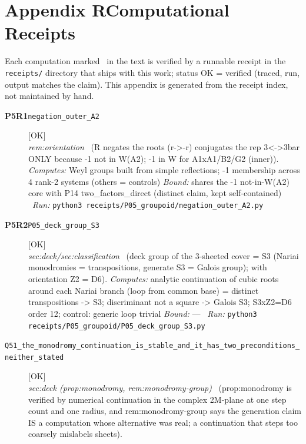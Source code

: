 \clearpage
\section*{Appendix R\quad Computational Receipts}\label{app:receipts}
\small\noindent Each computation marked \rcptmarker\ in the text is verified by a runnable receipt in the \texttt{receipts/} directory that ships with this work; status \textsf{OK} = verified (traced, run, output matches the claim). This appendix is generated from the receipt index, not maintained by hand.\par\medskip
\begingroup\renewcommand{\arraystretch}{1.25}
\begin{description}
\item[\textbf{P5R1}\quad\texttt{negation\_outer\_A2}]\hfill\textsf{[OK]}\\
\textit{rem:orientation} \ (R negates the roots (r->-r) conjugates the rep 3<->3bar ONLY because -1 not in W(A2); -1 in W for A1xA1/B2/G2 (inner)). 
\emph{Computes:} Weyl groups built from simple reflections; -1 membership across 4 rank-2 systems (others = controls)
 \emph{Bound:} shares the -1 not-in-W(A2) core with P14 two\_factors\_direct (distinct claim, kept self-contained)
\ \emph{Run:} \texttt{python3 receipts/P05\_groupoid/negation\_outer\_A2.py}
\item[\textbf{P5R2}\quad\texttt{P05\_deck\_group\_S3}]\hfill\textsf{[OK]}\\
\textit{sec:deck/sec:classification} \ (deck group of the 3-sheeted cover = S3 (Nariai monodromies = transpositions, generate S3 = Galois group); with orientation Z2 = D6). 
\emph{Computes:} analytic continuation of cubic roots around each Nariai branch (loop from common base) = distinct transpositions -> S3; discriminant not a square -> Galois S3; S3xZ2=D6 order 12; control: generic loop trivial
 \emph{Bound:} ---
\ \emph{Run:} \texttt{python3 receipts/P05\_groupoid/P05\_deck\_group\_S3.py}
\item[\label{rcpt:Q51_the_monodromy_continuation_is_stable_and_it_has_two_preconditions_neither_stated}\textbf{}\quad\texttt{Q51\_the\_monodromy\_continuation\_is\_stable\_and\_it\_has\_two\_preconditions\_neither\_stated}]\hfill\textsf{[OK]}\\
\textit{sec:deck (prop:monodromy, rem:monodromy-group)} \ (prop:monodromy is verified by numerical continuation in the complex 2M-plane at one step count and one radius, and rem:monodromy-group says the generation claim IS a computation whose alternative was real; a continuation that steps too coarsely mislabels sheets). 

\end{description}
